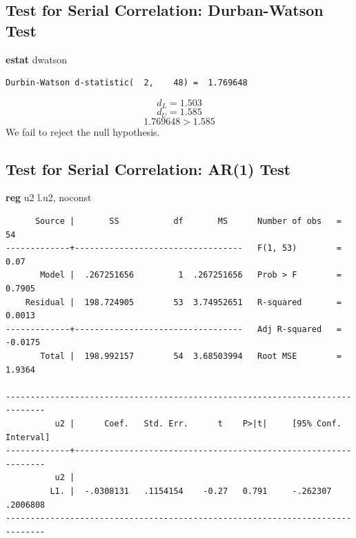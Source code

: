 \documentclass[
]{book}
\newenvironment{Shaded}{\begin{snugshade}}{\end{snugshade}}
\newcommand{\KeywordTok}[1]{\textcolor[rgb]{0.13,0.29,0.53}{\textbf{#1}}}
\newcommand{\NormalTok}[1]{#1}
\newcommand{\OtherTok}[1]{\textcolor[rgb]{0.56,0.35,0.01}{#1}}
\begin{document}
\subsection*{Test for Serial Correlation: Durban-Watson Test}\label{test-for-serial-correlation-durban-watson-test}

\begin{Shaded}
\begin{Highlighting}[]
    \KeywordTok{estat}\NormalTok{ dwatson}
\end{Highlighting}
\end{Shaded}

\begin{verbatim}
Durbin-Watson d-statistic(  2,    48) =  1.769648
\end{verbatim}

\[ d_L = 1.503 \]
\[ d_U = 1.585 \]
\[ 1.769648 > 1.585 \]
We fail to reject the null hypothesis.

\subsection*{Test for Serial Correlation: AR(1) Test}\label{test-for-serial-correlation-ar1-test}

\begin{Shaded}
\begin{Highlighting}[]
    \KeywordTok{reg}\NormalTok{ u2 }\OtherTok{l}\NormalTok{.u2, noconst}
\end{Highlighting}
\end{Shaded}

\begin{verbatim}
      Source |       SS           df       MS      Number of obs   =        54
-------------+----------------------------------   F(1, 53)        =      0.07
       Model |  .267251656         1  .267251656   Prob > F        =    0.7905
    Residual |  198.724905        53  3.74952651   R-squared       =    0.0013
-------------+----------------------------------   Adj R-squared   =   -0.0175
       Total |  198.992157        54  3.68503994   Root MSE        =    1.9364

------------------------------------------------------------------------------
          u2 |      Coef.   Std. Err.      t    P>|t|     [95% Conf. Interval]
-------------+----------------------------------------------------------------
          u2 |
         L1. |  -.0308131   .1154154    -0.27   0.791     -.262307    .2006808
------------------------------------------------------------------------------
\end{verbatim}
\end{document}
